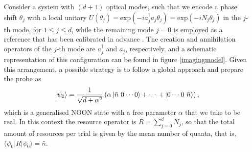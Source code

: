 Consider a system with $(d+1)$ optical modes, such that we encode a phase shift $\theta_j$ with a local unitary $U(\theta_j) = \mathrm{exp}(-i a_j^\dagger a_j \theta_j) = \mathrm{exp}(-i N_j \theta_j)$ in the $j$-th mode, for $1\leqslant j\leqslant d$, while the remaining mode $j=0$ is employed as a reference that has been calibrated in advance \cite{proctor2017networked}. The creation and annihilation operators of the $j$-th mode are $a_j^\dagger$ and $a_j$, respectively, and a schematic representation of this configuration can be found in figure \ref{imagingmodel}. Given this arrangement, a possible strategy is to follow a global approach and prepare the probe as
\begin{equation}
\ket{\psi_0} = \frac{1}{\sqrt{d+\alpha^2}}\left(\alpha\ket{\bar{n}~0 \cdots 0} + \cdots + \ket{0 \cdots 0~\bar{n}} \right),
\label{gnoons}
\end{equation}
which is a generalised NOON state \cite{knott2016local, humphreys2013} with a free parameter $\alpha$ that we take to be real. In this context the resource operator is $R = \sum_{j=0}^{d} N_j$, so that the total amount of resources per trial is given by the mean number of quanta, that is, $\langle \psi_0 |  R | \psi_0 \rangle = \bar{n}$. 

